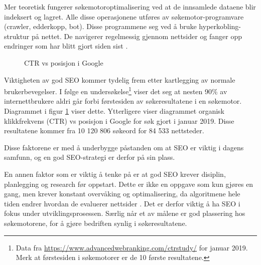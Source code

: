 Mer teoretisk fungerer søkemotoroptimalisering ved at de innsamlede dataene blir indeksert og lagret. Alle disse operasjonene utføres av søkemotor-programvare (crawler, edderkopp,
bot). Disse programmene  seg ved å bruke hyperkobling-struktur på nettet. De navigerer regelmessig gjennom nettsider og fanger opp endringer som har blitt gjort siden sist  \cite[s.~488]{yalccin2010search}.

\begin{figure}[H]
    \centering
    \caption{CTR vs posisjon i Google}
    \label{fig:analysis-awr-google-ctr}
\end{figure}

Viktigheten av god SEO kommer tydelig frem etter kartlegging av normale brukerbevegelser. I følge en undersøkelse\footnote{Data fra \url{https://www.advancedwebranking.com/ctrstudy/} for januar 2019. Merk at førstesiden i søkemotorer er de 10 første resultatene.} viser det seg at nesten 90\% av internettbrukere aldri går forbi førstesiden av søkeresultatene i en søkemotor. Diagrammet i figur \ref{fig:analysis-awr-google-ctr} viser dette. Ytterligere viser diagrammet organisk klikkfrekvens (CTR) vs posisjon i Google for søk gjort i januar 2019. Disse resultatene kommer fra 10 120 806 søkeord for 84 533 nettsteder.

Disse faktorene er med å underbygge påstanden om at SEO er viktig i dagens samfunn, og en god SEO-strategi er derfor på sin plass. 

En annen faktor som er viktig å tenke på er at god SEO krever disiplin, planlegging og research før oppstart. Dette er ikke en oppgave som kun gjøres en gang, men krever konstant overvåking og optimalisering, da algoritmene hele tiden endrer hvordan de evaluerer nettsider \cite[s.~1]{mitchell2012usb}. Det er derfor viktig å ha SEO i fokus under utviklingsprosessen. Særlig når et av målene er god plassering hos søkemotorene, for å gjøre bedriften synlig i søkeresultatene.

